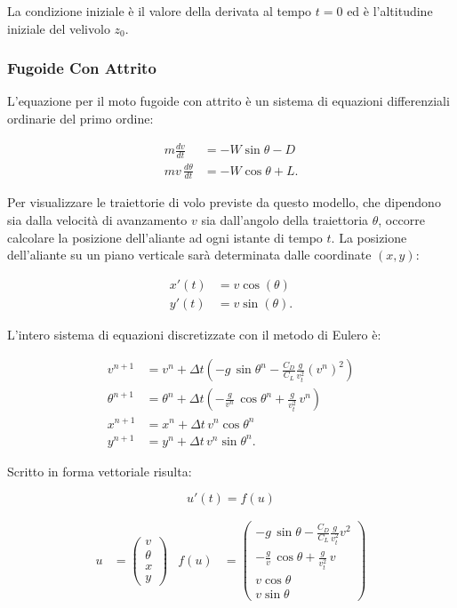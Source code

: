 \noindent 
La condizione iniziale è il valore della derivata al tempo $t=0$ ed è l'altitudine iniziale del velivolo $z_0$.

\subsubsection*{Fugoide Con Attrito}
L’equazione per il moto fugoide con attrito è un sistema di equazioni differenziali ordinarie del primo ordine: 

\begin{align}
m \frac{dv}{dt} & = - W \sin\theta - D \\
m v \, \frac{d\theta}{dt} & = - W \cos\theta + L.
\end{align}

\noindent
Per visualizzare le traiettorie di volo previste da questo modello, che dipendono sia dalla velocità di avanzamento $v$ sia dall’angolo della traiettoria $\theta$, occorre calcolare la posizione dell'aliante ad ogni istante di tempo $t$. La posizione dell’aliante su un piano verticale sarà determinata dalle coordinate $(x,y)$: 

\begin{align}
x'(t) & = v \cos(\theta) \\
y'(t) & = v \sin(\theta).
\end{align}

\noindent
L’intero sistema di equazioni discretizzate con il metodo di Eulero è:

\begin{align}
v^{n+1} & = v^n + \Delta t \left(- g\, \sin\theta^n - \frac{C_D}{C_L} \frac{g}{v_t^2} (v^n)^2 \right) \\
\theta^{n+1} & = \theta^n + \Delta t \left(- \frac{g}{v^n}\,\cos\theta^n + \frac{g}{v_t^2}\, v^n \right) \\
x^{n+1} & = x^n + \Delta t \, v^n \cos\theta^n \\
y^{n+1} & = y^n + \Delta t \, v^n \sin\theta^n.
\end{align}

\noindent
Scritto in forma vettoriale risulta: 

$$u'(t) = f(u)$$

\begin{align}
u & = \begin{pmatrix} v \\ \theta \\ x \\ y \end{pmatrix} & f(u) & = \begin{pmatrix} - g\, \sin\theta - \frac{C_D}{C_L} \frac{g}{v_t^2} v^2 \\ - \frac{g}{v}\,\cos\theta + \frac{g}{v_t^2}\, v \\ v\cos\theta \\ v\sin\theta \end{pmatrix}
\end{align}

